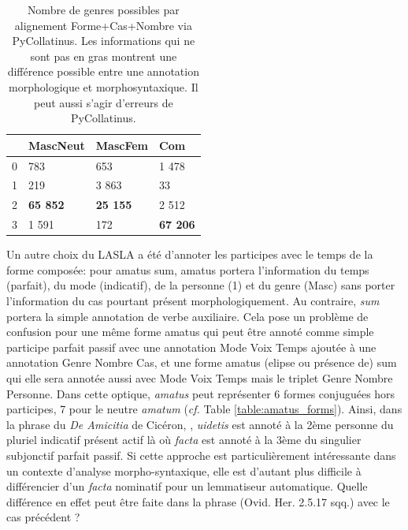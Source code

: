 \begin{table}[h]
\centering
\begin{tabular}{l|lll}
\toprule
         & MascNeut & MascFem & Com    \\ \midrule
0        & 783      & 653     & 1 478  \\
1        & 219      & 3 863   & 33     \\
2        & \textbf{65 852}   & \textbf{25 155}  & 2 512  \\
3        & 1 591    & 172     & \textbf{67 206} \\ \bottomrule
\end{tabular}
\caption{Nombre de genres possibles par alignement Forme+Cas+Nombre via PyCollatinus. Les informations qui ne sont pas en gras montrent une différence possible entre une annotation morphologique et morphosyntaxique. Il peut aussi s'agir d'erreurs de PyCollatinus.}
\label{table:lasla:genders-alignement}
\end{table}

\newpara

Un autre choix du LASLA a été d'annoter les participes avec le temps de la forme composée: pour amatus sum, amatus portera l'information du temps (parfait), du mode (indicatif), de la personne (1) et du genre (Masc) sans porter l'information du cas pourtant présent morphologiquement. Au contraire, \textit{sum} portera la simple annotation de verbe auxiliaire. Cela pose un problème de confusion pour une même forme amatus qui peut être annoté comme simple participe parfait passif avec une annotation Mode Voix Temps ajoutée à une annotation Genre Nombre Cas, et une forme amatus (elipse ou présence de) sum qui elle sera annotée aussi avec Mode Voix Temps mais le triplet Genre Nombre Personne. Dans cette optique, \textit{amatus} peut représenter 6 formes conjuguées hors participes, 7 pour le neutre \textit{amatum} (\textit{cf.} Table \ref{table:amatus_forms}). %
%
%
Ainsi, dans la phrase du \textit{De Amicitia} de Cicéron, , \textit{uidetis} est annoté à la 2ème personne du pluriel indicatif présent actif là où \textit{facta} est annoté à la 3ème du singulier subjonctif parfait passif. Si cette approche est particulièrement intéressante dans un contexte d'analyse morpho-syntaxique, elle est d'autant plus difficile à différencier d'un \textit{facta} nominatif pour un lemmatiseur automatique. Quelle différence en effet peut être faite dans la phrase  (Ovid. Her. 2.5.17 sqq.) avec le cas précédent ? %

